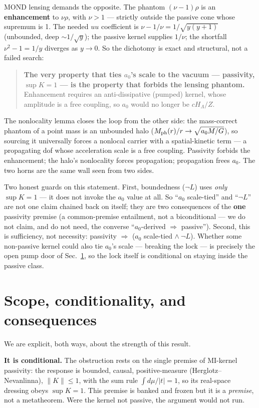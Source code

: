 \documentclass[11pt]{article}
\newcommand{\Mph}{M_{\rm ph}}
\begin{document}
MOND lensing demands the opposite. The phantom $(\nu-1)\rho$ is an \textbf{enhancement} to $\nu\rho$, with $\nu>1$ --- strictly outside the passive cone whose supremum is 1. The needed $uu$ coefficient is $\nu-1/\nu=1/\sqrt{y(y+1)}$ (unbounded, deep ${\sim}1/\sqrt y$); the passive kernel supplies $1/\nu$; the shortfall $\nu^2-1=1/y$ diverges as $y\to0$. So the dichotomy is exact and structural, not a failed search:
\begin{quote}
\textbf{The very property that ties $a_0$'s scale to the vacuum --- passivity, $\sup K=1$ --- is the property that forbids the lensing phantom.} Enhancement requires an anti-dissipative (pumped) kernel, whose amplitude is a free coupling, so $a_0$ would no longer be $cH_\Lambda/Z$.
\end{quote}
The nonlocality lemma closes the loop from the other side: the mass-correct phantom of a point mass is an unbounded halo ($\Mph(r)/r\to\sqrt{a_0M/G}$), so sourcing it universally forces a nonlocal carrier with a spatial-kinetic term --- a propagating dof whose acceleration scale is a free coupling. Passivity forbids the enhancement; the halo's nonlocality forces propagation; propagation frees $a_0$. The two horns are the same wall seen from two sides.

Two honest guards on this statement. First, boundedness ($\lnot L$) uses \emph{only} $\sup K=1$ --- it does not invoke the $a_0$ value at all. So ``$a_0$ scale-tied'' and ``$\lnot L$'' are not one claim chained back on itself; they are two consequences of the \textbf{one} passivity premise (a common-premise entailment, not a biconditional --- we do not claim, and do not need, the converse ``$a_0$-derived $\Rightarrow$ passive''). Second, this is sufficiency, not necessity: passivity $\Rightarrow$ ($a_0$ scale-tied $\wedge\ \lnot L$). Whether some non-passive kernel could also tie $a_0$'s scale --- breaking the lock --- is precisely the open pump door of Sec.~\ref{sec:conditionality}, so the lock itself is conditional on staying inside the passive class.

\section{Scope, conditionality, and consequences}\label{sec:conditionality}

We are explicit, both ways, about the strength of this result.

\textbf{It is conditional.} The obstruction rests on the single premise of MI-kernel passivity: the response is bounded, causal, positive-measure (Herglotz--Nevanlinna), $\|K\|\le1$, with the sum rule $\int d\mu/|t|=1$, so its real-space dressing obeys $\sup K=1$. This premise is banked and frozen \cite{zv4,zv11} but it is a \emph{premise}, not a metatheorem. Were the kernel not passive, the argument would not run.
\end{document}
